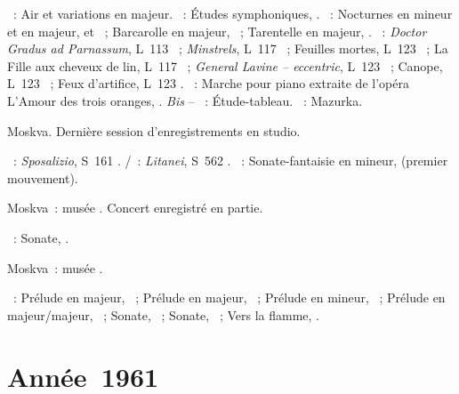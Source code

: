 \begin{description}
 \textsc{\Haendel{}}~: Air et variations en \kE majeur.
 \textsc{\Schumann{}}~: Études symphoniques, .
 \textsc{\Chopin{}}~: Nocturnes en \kC \Sharp mineur et en \kD \Flat majeur,
   et ~; Barcarolle en \kF \Sharp majeur,
 ~; Tarentelle en \kA \Flat majeur, .
 \textsc{\Debussy{}}~: \emph{Doctor Gradus ad Parnassum}, L~113 ~;
 \emph{Minstrels}, L~117 ~; Feuilles mortes, L~123 ~;
 La Fille aux cheveux de lin, L~117 ~; \emph{General Lavine --
 eccentric}, L~123 ~; Canope, L~123 ~; Feux d'artifice,
 L~123 .
 \textsc{\Prokofiev{}}~: Marche pour piano extraite de l'opéra L'Amour des
 trois oranges,  .
 \emph{Bis} -- \textsc{\Rachmaninov{}}~: Étude-tableau.
 \textsc{\Chopin{}}~: Mazurka.
 \item[\DateWithWeekDay{1960-12-11}]
 Moskva.
 Dernière session d'enregistrements en studio.

 \textsc{\Liszt{}}~: \emph{Sposalizio}, S~161 .
 \textsc{\Schubert{}/\Liszt{}}~: \emph{Litanei}, S~562 .
 \textsc{\Scriabine{}}~: Sonate-fantaisie  en \kG \Sharp mineur,
  (premier mouvement).
 \item[\DateWithWeekDay{1960-12-24}]
 Moskva~: musée \Scriabine{}.
 Concert enregistré en partie.

 \textsc{\Scriabine{}}~: Sonate, .
 \item[\DateWithWeekDay{1960-12-27}]
 Moskva~: musée \Scriabine{}.

 \textsc{\Scriabine{}}~: Prélude en \kB \Flat majeur,  ~;
 Prélude en \kD \Flat majeur,  ~; Prélude en \kB \Flat
 mineur,  ~; Prélude en \kD \Flat majeur/\kC majeur,
  ~; Sonate, ~; Sonate, ~; Vers la
 flamme, .
\end{description}

\section{Année~1961}

